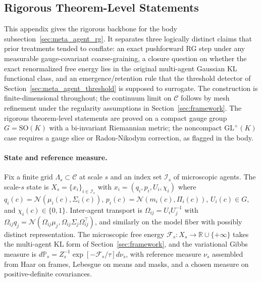 \documentclass[11pt]{article}
\begin{document}
\subsection{Rigorous Theorem-Level Statements}
\label{app:rigorous_rg}

This appendix gives the rigorous backbone for the body subsection~\ref{sec:meta_agent_rg}. It separates three logically distinct claims that prior treatments tended to conflate: an exact pushforward RG step under any measurable gauge-covariant coarse-graining, a closure question on whether the exact renormalized free energy lies in the original multi-agent Gaussian KL functional class, and an emergence/retention rule that the threshold detector of Section~\ref{sec:meta_agent_threshold} is supposed to surrogate. The construction is finite-dimensional throughout; the continuum limit on $\mathcal{C}$ follows by mesh refinement under the regularity assumptions in Section~\ref{sec:framework}. The rigorous theorem-level statements are proved on a compact gauge group $G = \mathrm{SO}(K)$ with a bi-invariant Riemannian metric; the noncompact $\mathrm{GL}^+(K)$ case requires a gauge slice or Radon-Nikodym correction, as flagged in the body.

\paragraph{State and reference measure.}
Fix a finite grid $\Lambda_s \subset \mathcal{C}$ at scale $s$ and an index set $\mathcal{I}_s$ of microscopic agents. The scale-$s$ state is $X_s = \{x_i\}_{i \in \mathcal{I}_s}$ with $x_i = (q_i, p_i, U_i, \chi_i)$ where $q_i(c) = \mathcal{N}(\mu_i(c), \Sigma_i(c))$, $p_i(c) = \mathcal{N}(m_i(c), \Pi_i(c))$, $U_i(c) \in G$, and $\chi_i(c) \in \{0, 1\}$. Inter-agent transport is $\Omega_{ij} = U_i U_j^{-1}$ with $\Omega_{ij} q_j = \mathcal{N}(\Omega_{ij}\mu_j, \Omega_{ij}\Sigma_j\Omega_{ij}^\top)$, and similarly on the model fiber with possibly distinct representation. The microscopic free energy $\mathcal{F}_s : X_s \to \mathbb{R} \cup \{+\infty\}$ takes the multi-agent KL form of Section~\ref{sec:framework}, and the variational Gibbs measure is $d\mathbb{P}_s = Z_s^{-1}\exp[-\mathcal{F}_s/\tau] d\nu_s$, with reference measure $\nu_s$ assembled from Haar on frames, Lebesgue on means and masks, and a chosen measure on positive-definite covariances.
\end{document}
